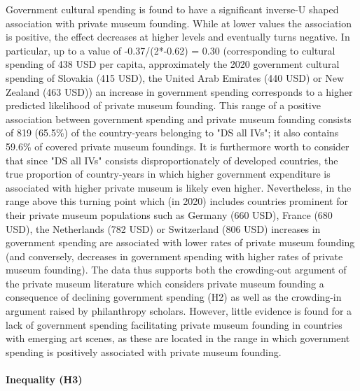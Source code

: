 \documentclass[11pt]{article}
\begin{document}
Government cultural spending is found to have a significant inverse-U shaped association with private museum founding.
While at lower values the association is positive, the effect decreases at higher levels and eventually turns negative.
In particular, up to a value of -0.37/(2*-0.62) = 0.30 (corresponding to cultural spending of 438 USD per capita, approximately the 2020 government cultural spending of Slovakia (415 USD), the United Arab Emirates (440 USD) or New Zealand (463 USD)) an increase in government spending corresponds to a higher predicted likelihood of private museum founding. 
This range of a positive association between government spending and private museum founding consists of 819 (65.5\%) of the country-years belonging to "DS all IVs"; it also contains 59.6\% of covered private museum foundings.
It is furthermore worth to consider that since "DS all IVs" consists disproportionately of developed countries, the true proportion of country-years in which higher government expenditure is associated with higher private museum is likely even higher.
Nevertheless, in the range above this turning point which (in 2020) includes countries prominent for their private museum populations such as Germany (660 USD), France (680 USD), the Netherlands (782 USD) or Switzerland (806 USD) increases in government spending are associated with lower rates of private museum founding (and conversely, decreases in government spending with higher rates of private museum founding).
The data thus supports both the crowding-out argument of the private museum literature which considers private museum founding  a consequence of declining government spending (H2) as well as the crowding-in argument raised by philanthropy scholars. 
However, little evidence is found for a lack of government spending facilitating private museum founding in countries  with emerging art scenes, as these are located in the range in which government spending is positively associated with private museum founding. 

\paragraph*{Inequality (H3)}
\end{document}

